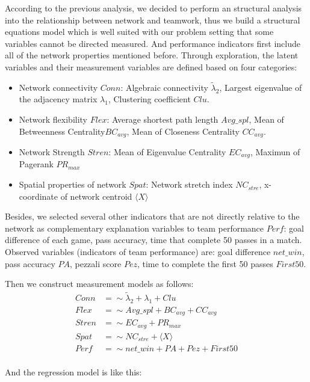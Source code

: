 \documentclass{mcmthesis}
\begin{document}
According to the previous analysis, we decided to perform an structural analysis into the relationship between network and teamwork, thus we build a structural equations model which is well suited with our problem setting that some variables cannot be directed measured. And performance indicators first include all of the network properties mentioned before. Through exploration, the latent variables and their measurement variables are defined based on four categories: 
\begin{itemize}
  \item Network connectivity $Conn$: Algebraic connectivity $\tilde\lambda_2$, Largest eigenvalue of the adjacency matrix $\lambda_1$, Clustering coefficient $Clu$.
  \item Network flexibility $Flex$: Average shortest path length $Avg\_spl$, Mean of Betweenness Centrality$BC_{avg}$, Mean of Closeness Centrality $CC_{avg}$.
  \item Network Strength $Stren$: Mean of Eigenvalue Centrality $EC_{avg}$, Maximun of Pagerank $PR_{max}$
  \item Spatial properties of network $Spat$: Network stretch index $NC_{stre}$, x-coordinate of network centroid $\langle X\rangle$
\end{itemize}
Besides, we selected several other indicators that are not directly relative to the network as complementary explanation variables to team performance $Perf$: goal difference of each game, pass accuracy, time that complete 50 passes in a match.
Observed variables (indicators of team performance) are: goal difference $net\_win$, pass accuracy $PA$, pezzali score $Pez$, time to complete the first 50 passes $First50$.

Then we construct measurement models as follows:
\begin{equation}
  \begin{split}
    Conn &=\sim \tilde\lambda_2 + \lambda_1 + Clu \\
    Flex  &=\sim Avg\_spl + BC_{avg} + CC_{avg} \\
    Stren &=\sim EC_{avg} + PR_{max} \\
    Spat &=\sim NC_{stre} + \langle X\rangle \\
    Perf &=\sim net\_win + PA + Pez + First50 \\
  \end{split}
\end{equation}

And the regression model is like this:
\end{document}

